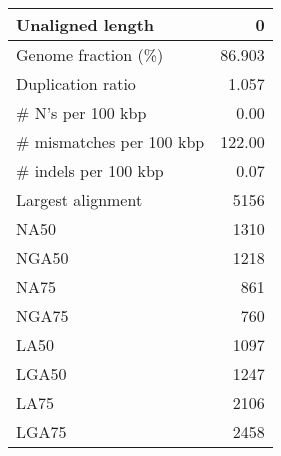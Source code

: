 \documentclass[12pt,a4paper]{article}
\begin{document}
\begin{table}[ht]
\begin{center}
\begin{tabular}{|l*{1}{|r}|}
Unaligned length & 0 \\ \hline
Genome fraction (\%) & 86.903 \\ \hline
Duplication ratio & 1.057 \\ \hline
\# N's per 100 kbp & 0.00 \\ \hline
\# mismatches per 100 kbp & 122.00 \\ \hline
\# indels per 100 kbp & 0.07 \\ \hline
Largest alignment & 5156 \\ \hline
NA50 & 1310 \\ \hline
NGA50 & 1218 \\ \hline
NA75 & 861 \\ \hline
NGA75 & 760 \\ \hline
LA50 & 1097 \\ \hline
LGA50 & 1247 \\ \hline
LA75 & 2106 \\ \hline
LGA75 & 2458 \\ \hline
\end{tabular}
\end{center}
\end{table}
\end{document}

